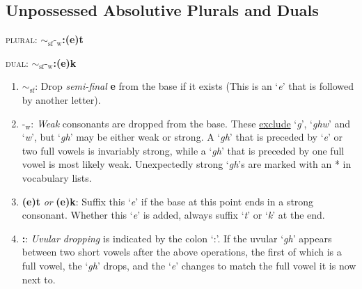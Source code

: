 \documentclass{article}
\begin{document}
\subsection{Unpossessed Absolutive Plurals and Duals}

\textsc{plural}: \textbf{${\sim}_\text{sf}\text{-}_\text{w}$:(e)t}

\noindent \textsc{dual}: \textbf{${\sim}_\text{sf}\text{-}_\text{w}$:(e)k}

\begin{enumerate}
\item \textbf{${\sim}_\text{sf}$}: Drop \textit{semi-final} \textbf{e} from the base if it exists (This is an `\textit{e}' that is followed by another letter).
\item \textbf{$\text{-}_\text{w}$}: \textit{Weak} consonants are dropped from the base. These \underline{exclude} `\textit{g}', `\textit{ghw}' and `\textit{w}', but `\textit{gh}' may be either weak or strong. A `\textit{gh}' that is preceded by `\textit{e}' or two full vowels is invariably strong, while a `\textit{gh}' that is preceded by one full vowel is most likely weak. Unexpectedly strong `\textit{gh}'s are marked with an * in vocabulary lists.
\item \textbf{(e)t} \textit{or} \textbf{(e)k}: Suffix this `\textit{e}' if the base at this point ends in a strong consonant. Whether this `\textit{e}' is added, always suffix `\textit{t}' or `\textit{k}' at the end.
\item \textbf{:}: \textit{Uvular dropping} is indicated by the colon `:'. If the uvular `\textit{gh}' appears between two short vowels after the above operations, the first of which is a full vowel, the `\textit{gh}' drops, and the `\textit{e}' changes to match the full vowel it is now next to.
\end{enumerate}
\end{document}
